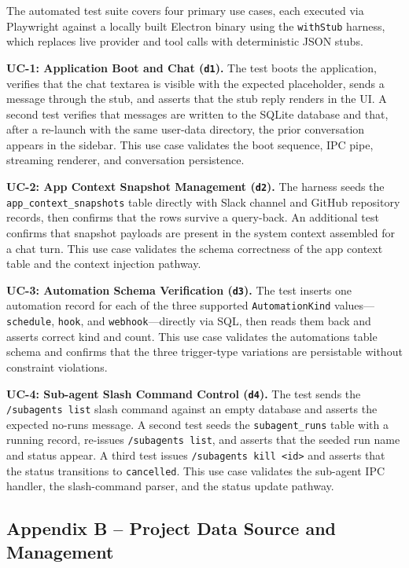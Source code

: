 \documentclass[conference]{IEEEtran}
\begin{document}
The automated test suite covers four primary use cases, each executed via Playwright against a locally built Electron binary using the \texttt{withStub} harness, which replaces live provider and tool calls with deterministic JSON stubs.

\textbf{UC-1: Application Boot and Chat (\texttt{d1}).} The test boots the application, verifies that the chat textarea is visible with the expected placeholder, sends a message through the stub, and asserts that the stub reply renders in the UI. A second test verifies that messages are written to the SQLite database and that, after a re-launch with the same user-data directory, the prior conversation appears in the sidebar. This use case validates the boot sequence, IPC pipe, streaming renderer, and conversation persistence.

\textbf{UC-2: App Context Snapshot Management (\texttt{d2}).} The harness seeds the \texttt{app\_context\_snapshots} table directly with Slack channel and GitHub repository records, then confirms that the rows survive a query-back. An additional test confirms that snapshot payloads are present in the system context assembled for a chat turn. This use case validates the schema correctness of the app context table and the context injection pathway.

\textbf{UC-3: Automation Schema Verification (\texttt{d3}).} The test inserts one automation record for each of the three supported \texttt{AutomationKind} values---\texttt{schedule}, \texttt{hook}, and \texttt{webhook}---directly via SQL, then reads them back and asserts correct kind and count. This use case validates the automations table schema and confirms that the three trigger-type variations are persistable without constraint violations.

\textbf{UC-4: Sub-agent Slash Command Control (\texttt{d4}).} The test sends the \texttt{/subagents list} slash command against an empty database and asserts the expected no-runs message. A second test seeds the \texttt{subagent\_runs} table with a running record, re-issues \texttt{/subagents list}, and asserts that the seeded run name and status appear. A third test issues \texttt{/subagents kill <id>} and asserts that the status transitions to \texttt{cancelled}. This use case validates the sub-agent IPC handler, the slash-command parser, and the status update pathway.

\subsection*{Appendix B -- Project Data Source and Management}
\end{document}
